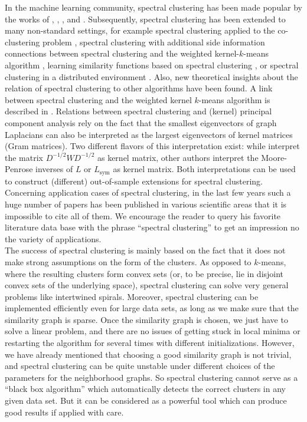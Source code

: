 \documentclass{article}
\newcommand{\Lun}{L}
\newcommand{\Lsym}{L_{\text{sym}}}
\begin{document}
In the machine learning community, spectral clustering has been made popular
by the works of ,
, 
, and . Subsequently, spectral clustering has been extended to many non-standard settings, for example 
%
spectral clustering applied to the co-clustering problem
\cite{Dhillon01}, 
%
spectral clustering with additional side information \cite{Joachims03}
%
%
connections between spectral clustering and the weighted kernel-$k$-means
algorithm \cite{DhiGuaKul05}, 
%
learning similarity functions based on spectral clustering 
\cite{BachJordan04}, 
%
%
or spectral clustering in a distributed environment
\cite{KemMcs04}. 
%
Also, new theoretical insights about the relation of spectral
clustering to other algorithms have been found. A link between
spectral clustering and the weighted kernel $k$-means algorithm is
described in . Relations between spectral clustering
and (kernel) principal component analysis rely on the fact that the
smallest eigenvectors of graph Laplacians can also be interpreted as
the largest eigenvectors of kernel matrices (Gram matrices). Two
different flavors of this interpretation exist: while
 interpret the matrix $D^{-1/2}W D^{-1/2}$ as
kernel matrix, other authors \cite{SaeFouYenDup04} interpret the
Moore-Penrose inverses of $\Lun$ or $\Lsym$ as kernel matrix. Both
interpretations can be used to construct (different) out-of-sample
extensions for spectral clustering. Concerning application cases of
spectral clustering, in the last few years such a huge number of
papers has been published in various scientific areas that it is
impossible to cite all of them. We encourage the reader to query his
favorite literature data base with the phrase ``spectral clustering''
to get an impression no the variety of applications.\\




The success of spectral clustering is mainly based on the fact that it
does not make strong assumptions on the form of the clusters. As
opposed to $k$-means, where the resulting clusters form convex
sets (or, to be precise, lie in disjoint convex sets of the underlying space), spectral
clustering can solve very general problems like intertwined
spirals. Moreover, spectral clustering can be implemented efficiently
even for large data sets, as long as we make sure that the similarity
graph is sparse. Once the similarity graph is chosen, we just have to
solve a linear problem, and there are no issues of getting stuck in
local minima or restarting the algorithm for several times with
different initializations. However, we have already mentioned that
choosing a good similarity graph is not trivial, and spectral
clustering can be quite unstable under different choices of the
parameters for the neighborhood graphs.
%
So spectral clustering cannot serve as a ``black box algorithm'' which
automatically detects the correct clusters in any given data set. But
it can be considered as a powerful tool which can produce 
good results if applied with care.\\
\end{document}
